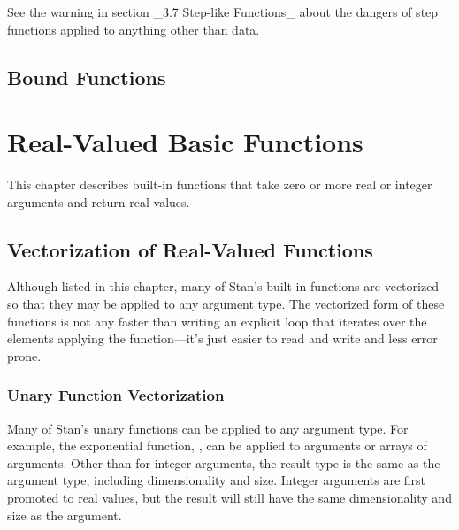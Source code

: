 \begin{description}
{See the warning in section _3.7 Step-like Functions_ about the dangers of step functions applied to anything other than data.


\section{Bound Functions}


\begin{description}       \end{description}


\chapter{Real-Valued Basic Functions}


This chapter describes built-in functions that take zero or more real or integer arguments and return real values.


\section{Vectorization of Real-Valued Functions}\label{fun-vectorization.section}


Although listed in this chapter, many of Stan's built-in functions are vectorized so that they may be applied to any argument type.  The vectorized form of these functions is not any faster than writing an explicit loop that iterates over the elements applying the function---it's just easier to read and write and less error prone.


\subsection{Unary Function Vectorization}


Many of Stan's unary functions can be applied to any argument type. For example, the exponential function, , can be applied to  arguments or arrays of  arguments.  Other than for integer arguments, the result type is the same as the argument type, including dimensionality and size.  Integer arguments are first promoted to real values, but the result will still have the same dimensionality and size as the argument.


}
\end{description}

